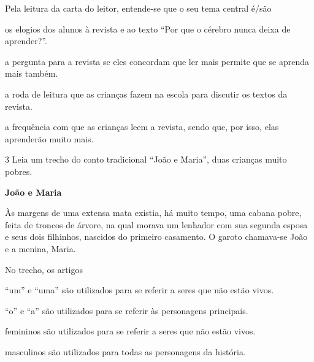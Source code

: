 Pela leitura da carta do leitor, entende-se que o seu tema central é/são

\begin{escolha}
\item os elogios dos alunos à revista e ao texto ``Por que o cérebro nunca 
deixa de aprender?''.

\item a pergunta para a revista se eles concordam que ler mais permite que
se aprenda mais também.

\item a roda de leitura que as crianças fazem na escola para discutir
os textos da revista.

\item a frequência com que as crianças leem a revista, sendo que, por
isso, elas aprenderão muito mais.
\end{escolha}

\num{3} Leia um trecho do conto tradicional ``João e Maria'', duas crianças muito pobres.

\begin{myquote}
\textbf{João e Maria}

Às margens de uma extensa mata existia, há muito tempo, uma cabana
pobre, feita de troncos de árvore, na qual morava um lenhador com sua
segunda esposa e seus dois filhinhos, nascidos do primeiro casamento. 
O garoto chamava-se João e a menina, Maria.

\end{myquote}

\pagebreak
No trecho, os artigos

\begin{escolha}
\item ``um'' e ``uma'' são utilizados para se referir a seres que não estão vivos.

\item ``o'' e ``a'' são utilizados para se referir às personagens principais.

\item femininos são utilizados para se referir a seres que não estão vivos.

\item masculinos são utilizados para todas as personagens da história.
\end{escolha}

